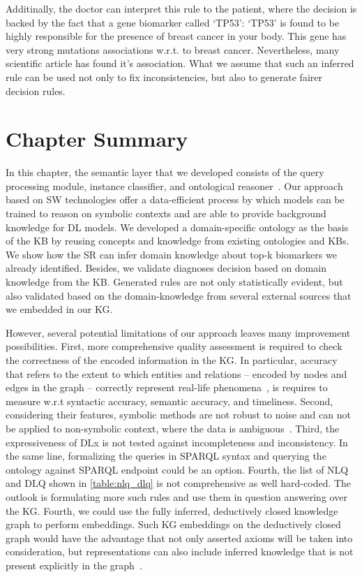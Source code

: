 \hspace*{3.5mm} Additinally, the doctor can interpret this rule to the patient, where the decision is backed by the fact that a gene biomarker called `TP53': `TP53' is found to be highly responsible for the presence of breast cancer in your body. This gene has very strong mutations associations w.r.t. to breast cancer. Nevertheless, many scientific article has found it's association. What we assume that such an inferred rule can be used not only to fix inconsistencies, but also to generate fairer decision rules. 

\section{Chapter Summary}\label{chapter_8:conclusion}
In this chapter, the semantic layer that we developed consists of the query processing module, instance classifier, and ontological reasoner~\cite{futia2020integration}. Our approach based on SW technologies offer a data-efficient process by which models can be trained to reason on symbolic contexts and are able to provide background knowledge for DL models. We developed a domain-specific ontology as the basis of the KB by reusing concepts and knowledge from existing ontologies and KBs. We show how the SR can infer domain knowledge about top-k biomarkers we already identified. 
Besides, we validate diagnoses decision based on domain knowledge from the KB. 
Generated rules are not only statistically evident, but also validated based on the domain-knowledge from several external sources that we embedded in our KG. 

\hspace*{3.5mm} However, several potential limitations of our approach leaves many improvement possibilities. First, more comprehensive quality assessment is required to check the correctness of the encoded information in the KG. In particular, accuracy that refers to the extent to which entities and relations – encoded by nodes and edges in the graph – correctly represent real-life phenomena~\cite{hogan2020knowledge}, is requires to measure w.r.t syntactic accuracy, semantic accuracy, and timeliness. 
Second, considering their features, symbolic methods are not robust to noise and can not be applied to non-symbolic context, where the data is ambiguous~\cite{futia2020integration}. Third, the expressiveness of DLx is not tested against incompleteness and inconsistency. In the same line, formalizing the queries in SPARQL syntax and querying the ontology against SPARQL endpoint could be an option. Fourth, the list of NLQ and DLQ shown in \cref{table:nlq_dlq} is not comprehensive as well hard-coded. The outlook is formulating more such rules and use them in question answering over the KG. Fourth, we could use the fully inferred, deductively closed knowledge graph to perform embeddings. Such KG embeddings on the deductively closed graph would have  the advantage that not only asserted axioms will be taken into consideration, but representations can also include inferred knowledge that is not present explicitly in the graph~\cite{alshahrani2017neuro}. 

